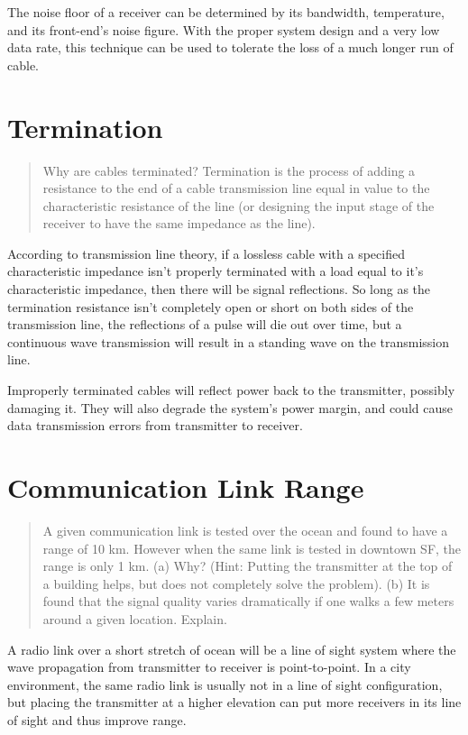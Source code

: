 \documentclass[11pt]{article}
\begin{document}
The noise floor of a receiver can be determined by its bandwidth, temperature, and its front-end's noise figure. With the proper system design and a very low data rate, this technique can be used to tolerate the loss of a much longer run of cable.

\section{Termination}
\begin{quote}
Why are cables terminated? Termination is the process of adding a resistance to the end of a cable transmission line equal in value to the characteristic resistance of the line (or designing the input stage of the receiver to have the same impedance as the line).
\end{quote}

According to transmission line theory, if a lossless cable with a specified characteristic impedance isn't properly terminated with a load equal to it's characteristic impedance, then there will be signal reflections. So long as the termination resistance isn't completely open or short on both sides of the transmission line, the reflections of a pulse will die out over time, but a continuous wave transmission will result in a standing wave on the transmission line.

Improperly terminated cables will reflect power back to the transmitter, possibly damaging it. They will also degrade the system's power margin, and could cause data transmission errors from transmitter to receiver.

\section{Communication Link Range}
\begin{quote}
	A given communication link is tested over the ocean and found to have a range of 10 km. However when the same link is tested in downtown SF, the range is only
	1 km. (a) Why? (Hint: Putting the transmitter at the top of a building helps, but does not completely solve the problem). (b) It is found that the signal quality varies dramatically if one walks a few meters around a given location. Explain.
\end{quote}

A radio link over a short stretch of ocean will be a line of sight system where the wave propagation from transmitter to receiver is point-to-point. In a city environment, the same radio link is usually not in a line of sight configuration, but placing the transmitter at a higher elevation can put more receivers in its line of sight and thus improve range.
\end{document}
